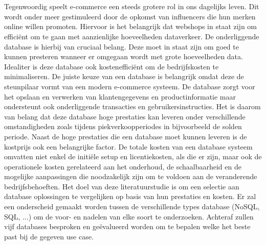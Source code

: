 
\chapter{}%
\label{ch:inleiding}

Tegenwoordig speelt e-commerce een steeds grotere rol in ons dagelijks leven. Dit wordt onder meer gestimuleerd door de opkomst van influencers die hun merken online willen promoten. Hiervoor is het belangrijk dat webshops in staat zijn om efficiënt om te gaan met aanzienlijke hoeveelheden dataverkeer. De onderliggende database is hierbij van cruciaal belang. Deze moet in staat zijn om goed te kunnen presteren wanneer er omgegaan wordt met grote hoeveelheden data. Idealiter is deze database ook kostenefficiënt om de bedrijfskosten te minimaliseren.
De juiste keuze van een database is belangrijk omdat deze de steunpilaar vormt van een modern e-commerce systeem. De database zorgt voor het opslaan en verwerken van klantengegevens en productinformatie maar ondersteunt ook onderliggende transacties en gebruikersinstructies. Het is daarom van belang dat deze database hoge prestaties kan leveren onder verschillende omstandigheden zoals tijdens piekverkoopperiodes in bijvoorbeeld de solden periode.
Naast de hoge prestaties die een database moet kunnen leveren is de kostprijs ook een belangrijke factor. De totale kosten van een database systeem omvatten niet enkel de initiële setup en licentiekosten, als die er zijn, maar ook de operationele kosten gerelateerd aan het onderhoud, de schaalbaarheid en de mogelijke aanpassingen die noodzakelijk zijn om te voldoen aan de veranderende bedrijfsbehoeften.
Het doel van deze literatuurstudie is om een selectie aan database oplossingen te vergelijken op basis van hun prestaties en kosten. Er zal een onderscheid gemaakt worden tussen de verschillende types database (NoSQL, SQL, ...) om de voor- en nadelen van elke soort te onderzoeken. Achteraf zullen vijf databases besproken en geëvalueerd worden om te bepalen welke het beste past bij de gegeven use case.



